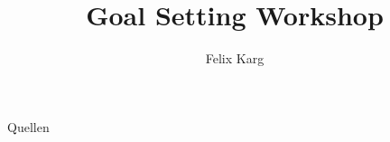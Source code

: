 \usepackage[ngerman, english]{babel}


\title{Goal Setting Workshop}
\author{Felix Karg}


\graphicspath{ {./img/} {../template/} {../template_tex/} } %

\newif\iftwocols
\twocolsfalse





\newif\ifonline
\onlinefalse

% 
% 

% 
% 
% 






\begin{frame}{Quellen}
% 


\end{frame}





